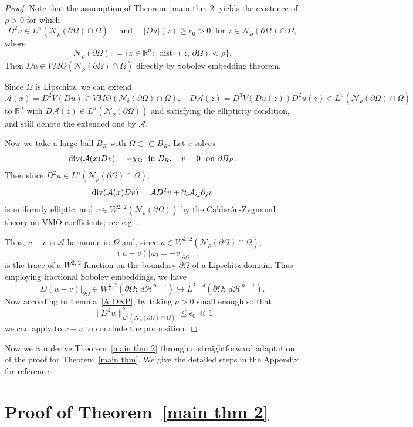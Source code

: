 \documentclass[reqno,11pt]{amsart}
\def\dist{{\mathop\mathrm{\,dist\,}}}
\def\ez{\epsilon}
\numberwithin{equation}{section}
\theoremstyle{remark}
\begin{document}
\begin{proof}
Note that  the assumption of  Theorem~\ref{main thm 2} yields the existence of $\rho>0$ for which
$$D^2u\in L^n(\mathcal N_\rho(\partial\Omega)\cap \Omega) \quad \text{  and } \quad  |Du|(z)\ge c_0>0 \ \text{ for $z\in \mathcal N_\rho(\partial\Omega)\cap \Omega$}, $$
where 
$$\mathcal N_\rho(\partial \Omega): =\{z\in \mathbb R^n\colon \dist(z,\,\partial\Omega)<\rho\}.$$ 
Then $Du\in VMO(\mathcal N_\rho(\partial\Omega)\cap \Omega)$ directly by Sobolev embedding theorem. 

Since $\Omega$ is Lipschitz, we can extend 
$$\mathcal A(x)=D^2V(Du)\in VMO(\mathcal N_\delta(\partial \Omega)\cap \Omega), \quad D\mathcal A(z)= D^3V(Du(z))D^2u(z)\in L^n(\mathcal N_\rho(\partial\Omega)\cap \Omega)$$ 
to $\mathbb R^n$ with $D\mathcal A(z)\in L^n(\mathcal N_\rho(\partial\Omega))$ and satisfying the ellipticity condition, and still denote the extended one by $\mathcal A$.  

Now we take a large ball $B_R$ with $\Omega\subset\subset B_R$. Let $v$ solves
$${\rm div}( {\mathcal A}(x)Dv)=-\chi_{\Omega} \ \text{ in } B_R, \quad  v=0 \ \text{ on } \partial B_R. $$
Then since $D^2u\in L^n(\mathcal N_\rho(\partial\Omega)\cap \Omega), $
$${\rm div}( {\mathcal A}(x)Dv)= \mathcal A D^2v +  \partial_{i} \mathcal A_{ij} \partial_j v$$
is uniformly elliptic, and  $v\in W^{2,\,2}(\mathcal N_\rho(\partial\Omega) ) $ by the Calder\'on-Zygmund theory on VMO-coefficients; see e.g. \cite{C2004}.


Thus, $u-v$ is  $\mathcal A$-harmonic in $\Omega$ and, since $u\in W^{2,\,2}(\mathcal N_\rho(\partial\Omega)\cap \Omega)$,  
$$(u-v)|_{\partial\Omega}=-v|_{\partial\Omega}$$ 
is the trace of a $W^{2,\,2}$-function on the boundary $\partial\Omega$ of a Lipschitz domain. Thus employing fractional Sobolev embeddings, we have 
$$D(u-v)|_{\partial\Omega}\in W^{\frac 1 2, 2}(\partial\Omega;\,d\mathscr H^{n-1})\hookrightarrow L^{2+\delta}(\partial\Omega;\,d\mathscr H^{n-1}).$$
Now according to Lemma~\ref{A DKP}, by taking $\rho>0$ small enough so that $$ \|D^2u\|^2_{L^n(\mathcal N_\rho(\partial \Omega)\cap \Omega)}\le \ez_0\ll1$$ 
we can apply  \cite[Theorem 2.10]{DPR2017}  to $v-u$ to conclude the proposition. 
\end{proof}

Now we can derive Theorem~\ref{main thm 2} through a straightforward   adaptation of the proof for Theorem~\ref{main thm}. We give the detailed steps  in the Appendix for reference.

\appendix
\section{Proof of Theorem~\ref{main thm 2}}
\end{document}
